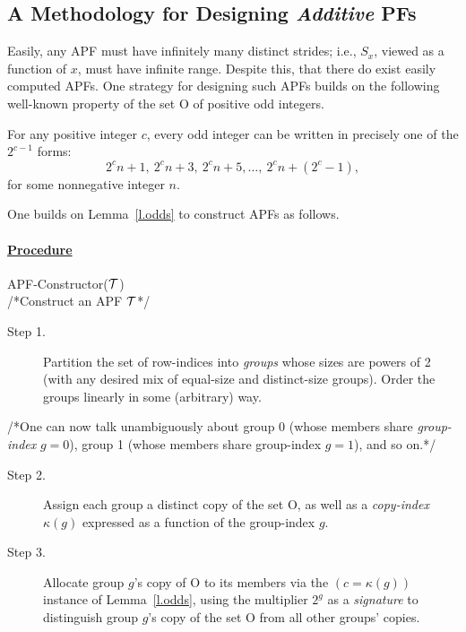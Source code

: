 \subsection{A Methodology for Designing {\em Additive} PFs}
\label{s.unbounded}

\renewcommand{\O}{{\sf O}}

Easily, any APF must have infinitely many distinct strides; i.e.,
$S_x$, viewed as a function of $x$, must have infinite range.  Despite
this, that there do exist easily computed APFs.  One strategy for
designing such APFs builds on the following well-known property of the
set \O\/ of positive odd integers.

\begin{lemma}
\label{l.odds}
For any positive integer $c$, every odd integer can be written
in precisely one of the $2^{c-1}$ forms:
\[ 2^c n +1, \ 2^c n +3, \ 2^c n +5, \ldots, \ 2^c n + (2^c -1), \]
for some nonnegative integer $n$.
\end{lemma}

\noindent
One builds on Lemma~\ref{l.odds} to construct APFs as follows.

\paragraph{\underline{Procedure}} {\sf APF-Constructor}($\mbox{$\cal T$}$) \\
/*Construct an APF $\mbox{$\cal T$}$*/
\begin{description}
\item[Step 1.]
Partition the set of row-indices into {\it groups} whose sizes are
powers of 2 (with any desired mix of equal-size and distinct-size
groups).  Order the groups linearly in some (arbitrary) way.
\end{description}
/*One can now talk unambiguously about group 0 (whose members share
{\it group-index} $g=0$), group 1 (whose members share group-index
$g=1$), and so on.*/
\begin{description}
\item[Step 2.]
Assign each group a distinct copy of the set \O, as well as a {\it
copy-index} $\kappa(g)$ expressed as a function of the group-index
$g$.

\item[Step 3.]
Allocate group $g$'s copy of \O\/ to its members via the $(c =
\kappa(g))$ instance of Lemma~\ref{l.odds}, using the multiplier $2^g$
as a {\it signature} to distinguish group $g$'s copy of the set \O\/
from all other groups' copies.
\end{description}

